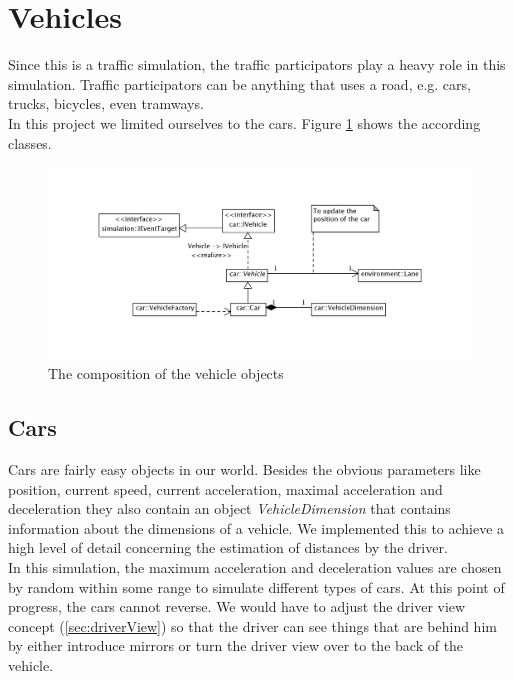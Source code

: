
\section{Vehicles}
\label{sec:vehicles}

Since this is a traffic simulation, the traffic participators play a
heavy role in this simulation. Traffic participators can be anything
that uses a road, e.g.  cars, trucks, bicycles, even tramways. \\

\noindent In this project we limited ourselves to the cars. Figure 
\ref{fig:vehicles} shows the according classes. \\

\begin{figure}[H]
\begin{center}
\includegraphics[width=\textwidth]{images/vehicles.png}
\end{center}
\caption{The composition of the vehicle objects}
\label{fig:vehicles}
\end{figure}

\subsection{Cars}

Cars are fairly easy objects in our world. Besides the obvious parameters
like position, current speed, current acceleration, maximal acceleration
and deceleration they also contain an object \emph{VehicleDimension} that
contains information about the dimensions of a vehicle. We implemented this
to achieve a high level of detail concerning the estimation of distances
by the driver. \\

In this simulation, the maximum acceleration and deceleration values
are chosen by random within some range to simulate different types of
cars. At this point of progress, the cars cannot reverse. We would have
to adjust the driver view concept (\ref{sec:driverView}) so that the
driver can see things that are behind him by either introduce mirrors
or turn the driver view over to the back of the vehicle.

